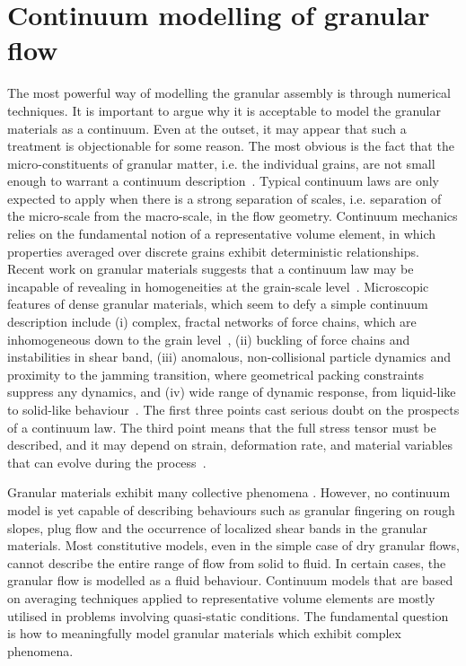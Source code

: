 \section{Continuum modelling of granular flow}

The most powerful way of modelling the granular assembly is through numerical 
techniques. It is important to argue why it is acceptable to model the 
granular materials as a continuum. Even at the outset, it may appear that 
such a treatment is objectionable for some reason. The most obvious is the fact 
that the micro-constituents of granular matter, i.e. the individual grains, are 
not small enough to warrant a continuum description~\citep{Kamrin2007}. Typical 
continuum laws are only expected to apply when there is a strong separation of 
scales, i.e. separation of the micro-scale from the macro-scale, in the flow 
geometry. Continuum mechanics relies on the fundamental notion of a 
representative volume element, in which properties averaged over discrete 
grains exhibit deterministic relationships. Recent work on granular 
materials suggests that a continuum law may be incapable of revealing 
in homogeneities at the grain-scale level~\citep{Rycroft2009b}. Microscopic 
features of dense granular materials, which seem to defy a simple continuum
description include (i) complex, fractal networks of force chains, which 
are inhomogeneous down to the grain level~\citep{Goldhirsch2003}, (ii) buckling 
of force chains and instabilities in shear band, (iii) anomalous, 
non-collisional particle dynamics and proximity to the jamming 
transition, where geometrical packing constraints suppress any dynamics, and 
(iv) wide range of dynamic response, from liquid-like to solid-like 
behaviour~\citep{Jaeger1996,Aranson2001,Aranson2002}. The first three
points cast serious doubt on the prospects of a continuum law. The third point 
means that the full stress tensor must be described, and it may depend on 
strain, deformation rate, and material variables that can evolve during the 
process~\citep{Rycroft2009b}.

Granular materials exhibit many collective phenomena \citep{Jaeger1996}. 
However, no continuum model is yet capable of describing behaviours such as 
granular fingering on rough slopes, plug flow and the 
occurrence of localized shear bands in the granular materials. Most 
constitutive models, even in the simple case 
of dry granular flows, cannot describe the entire range of flow from solid to 
fluid. In certain cases, the granular flow is modelled as a fluid behaviour. 
Continuum models that are based on averaging techniques applied to
representative volume elements are mostly utilised in problems involving 
quasi-static conditions. The fundamental question is how to meaningfully model 
granular materials which exhibit complex phenomena. 

